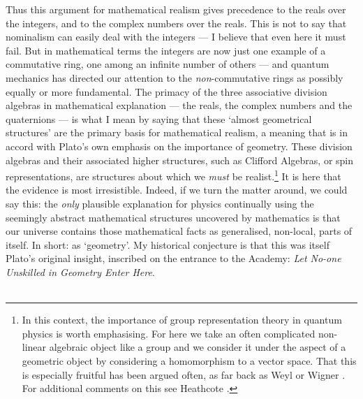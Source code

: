 \documentclass[11pt,oneside,a4paper]{article}
\begin{document}
Thus this argument for mathematical realism gives precedence to the reals over the integers, and to the complex numbers over the reals. This is not to say that nominalism can easily deal with the integers --- I believe that even here it must fail. But in mathematical terms the integers are now just one example of a commutative ring, one among an infinite number of others --- and quantum mechanics has directed our attention to the \textit{non}-commutative rings as possibly equally or more fundamental. The primacy of the three associative division algebras in mathematical explanation — the reals, the complex numbers and the quaternions — is what I mean by saying that these `almost geometrical structures' are the primary basis for mathematical realism, a meaning that is in accord with Plato's own emphasis on the importance of geometry. These division algebras and their associated higher structures, such as Clifford Algebras, or spin representations, are structures about which we \textit{must} be realist.\footnote{In this context, the importance of group representation theory in quantum physics is worth emphasising. For here we take an often complicated non-linear algebraic object like a group and we consider it under the aspect of a geometric object by considering a homomorphism to a vector space. That this is especially fruitful has been argued often, as far back as Weyl \parencite*{weyl_theory_1931} or Wigner \parencite{wigner_unitary_1939}. For additional comments on this see Heathcote \parencite*{heathcote_multiplicity_2021}.} It is here that the evidence is most irresistible. Indeed, if we turn the matter around, we could say this: the \textit{only} plausible explanation for physics continually using the seemingly abstract mathematical structures uncovered by mathematics is that our universe contains those mathematical facts as generalised, non-local, parts of itself. In short: as `geometry'. My historical conjecture is that this was itself Plato's original insight, inscribed on the entrance to the Academy: \textit{Let No-one Unskilled in Geometry Enter Here}.\\[1.5cm]

\\

\end{document}
